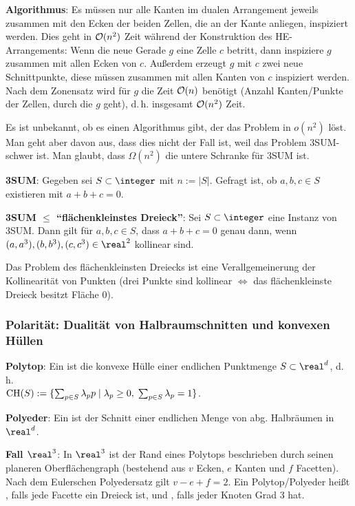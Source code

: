 \textbf{Algorithmus}:
Es müssen nur alle Kanten im dualen Arrangement jeweils
zusammen mit den Ecken der beiden Zellen, die an der Kante anliegen, inspiziert werden.
Dies geht in $\mathcal{O}(n^2)$ Zeit während der Konstruktion des HE-Arrangements:
Wenn die neue Gerade $g$ eine Zelle $c$ betritt, dann inspiziere $g$ zusammen mit allen Ecken von
$c$.
Außerdem erzeugt $g$ mit $c$ zwei neue Schnittpunkte, diese müssen zusammen mit allen Kanten
von $c$ inspiziert werden.
Nach dem Zonensatz wird für $g$ die Zeit $\mathcal{O}(n)$ benötigt
(Anzahl Kanten/Punkte der Zellen, durch die $g$ geht),
d.\,h. insgesamt $\mathcal{O}(n^2)$ Zeit.

\linie

Es ist unbekannt, ob es einen Algorithmus gibt, der das Problem in $o(n^2)$ löst.
Man geht aber davon aus, dass dies nicht der Fall ist, weil das Problem 3SUM-schwer ist.
Man glaubt, dass $\Omega(n^2)$ die untere Schranke für 3SUM ist.

\textbf{3SUM}:
Gegeben sei $S \subset \integer$ mit $n := |S|$.
Gefragt ist, ob $a, b, c \in S$ existieren mit $a + b + c = 0$.

\textbf{3SUM $\le$ "`flächenkleinstes Dreieck"'}:
Sei $S \subset \integer$ eine Instanz von 3SUM.
Dann gilt für $a, b, c \in S$, dass $a + b + c = 0$ genau dann, wenn
$(a, a^3), (b, b^3), (c, c^3) \in \real^2$ kollinear sind.

Das Problem des flächenkleinsten Dreiecks ist eine Verallgemeinerung der Kollinearität
von Punkten
(drei Punkte sind kollinear $\iff$ das flächenkleinste Dreieck besitzt Fläche $0$).

\pagebreak

\subsubsection{%
    Polarität: Dualität von Halbraumschnitten und konvexen Hüllen%
}

\textbf{Polytop}:
Ein  ist die konvexe Hülle einer
endlichen Punktmenge $S \subset \real^d$, d.\,h.\\
$\operatorname{CH}(S) := \{\sum_{p \in S} \lambda_p p \;|\; \lambda_p \ge 0,\; \sum_{p \in S} \lambda_p = 1\}$.

\textbf{Polyeder}:
Ein  ist der Schnitt einer endlichen Menge von abg. Halbräumen in $\real^d$.

\textbf{Fall $\real^3$}:
In $\real^3$ ist der Rand eines Polytops beschrieben durch seinen planeren Oberflächengraph
(bestehend aus $v$ Ecken, $e$ Kanten und $f$ Facetten).
Nach dem Eulerschen Polyedersatz gilt $v - e + f = 2$.
Ein Polytop/Polyeder heißt , falls jede Facette ein Dreieck ist,
und , falls jeder Knoten Grad 3 hat.

